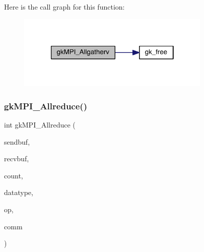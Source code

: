 Here is the call graph for this function\+:\nopagebreak
\begin{figure}[H]
\begin{center}
\leavevmode
\includegraphics[width=262pt]{a00359_a0b0b0098f344cad26f02c6f825bdde2c_cgraph}
\end{center}
\end{figure}
\mbox{\label{a00359_a192aab5cebcfc29f208341fec3f8fd3a}} 
\subsubsection{\texorpdfstring{gk\+M\+P\+I\+\_\+\+Allreduce()}{gkMPI\_Allreduce()}}
{\footnotesize\ttfamily int gk\+M\+P\+I\+\_\+\+Allreduce (\begin{DoxyParamCaption}\item[{void $\ast$}]{sendbuf,  }\item[{void $\ast$}]{recvbuf,  }\item[{\hyperlink{a00876_aaa5262be3e700770163401acb0150f52}{idx\+\_\+t}}]{count,  }\item[{M\+P\+I\+\_\+\+Datatype}]{datatype,  }\item[{M\+P\+I\+\_\+\+Op}]{op,  }\item[{M\+P\+I\+\_\+\+Comm}]{comm }\end{DoxyParamCaption})}

\mbox{\label{a00359_a6ebc719035504ecc821d960bcbbd1d4c}} 
